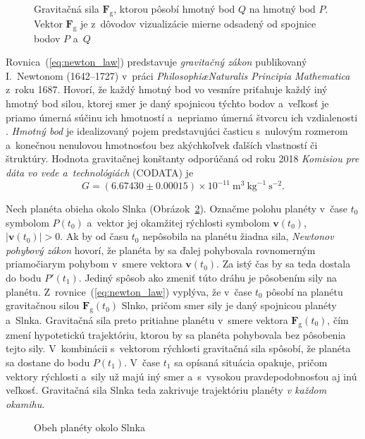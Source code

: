 \documentclass[a4paper, 12pt]{book}
\newcommand{\gidx}{\mathrm g}
\let\vec\mathbf
\begin{document}
\begin{figure}[b]
\centering

\caption{Gravitačná sila $\vec F_\gidx$, ktorou pôsobí hmotný bod $Q$ na hmotný
bod $P$.  Vektor $\vec F_\gidx$ je z~dôvodov vizualizácie mierne odsadený od
spojnice bodov $P$ a~$Q$}
\label{fig:newton_law}
\end{figure}

Rovnica~(\ref{eq:newton_law}) predstavuje \emph{gravitačný zákon} publikovaný
I.~Newtonom (1642--1727) v~práci \emph{Philosophi\ae Naturalis Principia
Mathematica} z~roku 1687.  Hovorí, že každý hmotný bod vo vesmíre priťahuje
každý iný hmotný bod silou, ktorej smer je daný spojnicou týchto bodov
a~veľkosť je priamo úmerná súčinu ich hmotností a~nepriamo úmerná štvorcu ich
vzdialenosti \citep{Kellogg1967}.  \emph{Hmotný bod} je idealizovaný pojem
predstavujúci časticu s~nulovým rozmerom a~konečnou nenulovou hmotnosťou bez
akýchkoľvek ďalších vlastností či štruktúry.  Hodnota gravitačnej konštanty
odporúčaná od roku 2018 \emph{Komisiou pre dáta vo vede a~technológiách}
(CODATA) je
%
\begin{equation}
G = (6.67430 \pm 0.00015) \times 10^{-11} \ \mathrm{m}^3 \ \mathrm{kg}^{-1}
\ \mathrm{s}^{-2}{.}
\end{equation}

Nech planéta obieha okolo Slnka (Obrázok~\ref{fig:orbital_motion}).  Označme
polohu planéty v~čase $t_0$ symbolom $P(t_0)$ a~vektor jej okamžitej rýchlosti
symbolom $\vec v(t_0)$, $| \vec v(t_0) | > 0$.  Ak by od času $t_0$ nepôsobila
na planétu žiadna sila, \emph{Newtonov pohybový zákon} hovorí, že planéta by sa
ďalej pohybovala rovnomerným priamočiarym pohybom v~smere vektora $\vec
v(t_0)$.  Za istý čas by sa teda dostala do bodu $P'(t_1)$.  Jediný spôsob ako
zmeniť túto dráhu je pôsobením sily na planétu.
Z~rovnice~(\ref{eq:newton_law}) vyplýva, že v~čase $t_0$ pôsobí na planétu
gravitačnou silou $\vec F_\gidx(t_0)$ Slnko, pričom smer sily je daný spojnicou
planéty a~Slnka.  Gravitačná sila preto pritiahne planétu v~smere vektora $\vec
F_\gidx(t_0)$, čím zmení hypotetickú trajektóriu, ktorou by sa planéta
pohybovala bez pôsobenia tejto sily.  V~kombinácii s~vektorom rýchlosti
gravitačná sila spôsobí, že planéta sa dostane do bodu $P(t_1)$.  V~čase $t_1$
sa opísaná situácia opakuje, pričom vektory rýchlosti a~sily už majú iný smer
a~s~vysokou pravdepodobnosťou aj inú veľkosť.  Gravitačná sila Slnka teda
zakrivuje trajektóriu planéty \emph{v každom okamihu}.

\begin{figure}
\centering

\caption{Obeh planéty okolo Slnka}
\label{fig:orbital_motion}
\end{figure}
\end{document}
